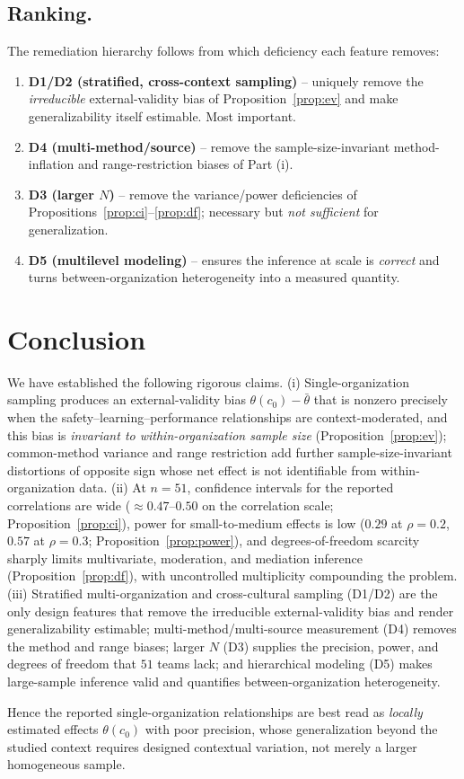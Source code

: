 \documentclass{amsart}
\theoremstyle{definition}
\begin{document}
\subsection*{Ranking.}
The remediation hierarchy follows from which deficiency each feature removes:
\begin{enumerate}
\item \textbf{D1/D2 (stratified, cross-context sampling)} -- uniquely remove
the \emph{irreducible} external-validity bias of
Proposition~\ref{prop:ev} and make generalizability itself estimable. Most
important.
\item \textbf{D4 (multi-method/source)} -- remove the
sample-size-invariant method-inflation and range-restriction biases of
Part (i).
\item \textbf{D3 (larger $N$)} -- remove the variance/power deficiencies of
Propositions~\ref{prop:ci}--\ref{prop:df}; necessary but \emph{not
sufficient} for generalization.
\item \textbf{D5 (multilevel modeling)} -- ensures the inference at scale is
\emph{correct} and turns between-organization heterogeneity into a measured
quantity.
\end{enumerate}

\section*{Conclusion}

We have established the following rigorous claims.
(i) Single-organization sampling produces an external-validity bias
$\theta(c_0)-\bar\theta$ that is nonzero precisely when the
safety--learning--performance relationships are context-moderated, and this
bias is \emph{invariant to within-organization sample size}
(Proposition~\ref{prop:ev}); common-method variance and range restriction
add further sample-size-invariant distortions of opposite sign whose net
effect is not identifiable from within-organization data.
(ii) At $n=51$, confidence intervals for the reported correlations are wide
($\approx0.47$--$0.50$ on the correlation scale; Proposition~\ref{prop:ci}),
power for small-to-medium effects is low ($0.29$ at $\rho=0.2$, $0.57$ at
$\rho=0.3$; Proposition~\ref{prop:power}), and degrees-of-freedom scarcity
sharply limits multivariate, moderation, and mediation inference
(Proposition~\ref{prop:df}), with uncontrolled multiplicity compounding the
problem.
(iii) Stratified multi-organization and cross-cultural sampling (D1/D2) are
the only design features that remove the irreducible external-validity bias
and render generalizability estimable; multi-method/multi-source measurement
(D4) removes the method and range biases; larger $N$ (D3) supplies the
precision, power, and degrees of freedom that $51$ teams lack; and
hierarchical modeling (D5) makes large-sample inference valid and quantifies
between-organization heterogeneity.

Hence the reported single-organization relationships are best read as
\emph{locally} estimated effects $\theta(c_0)$ with poor precision, whose
generalization beyond the studied context requires designed contextual
variation, not merely a larger homogeneous sample.
\end{document}
